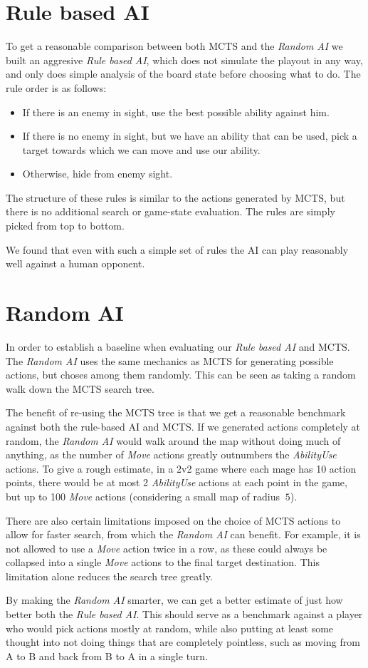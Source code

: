\section{Rule based AI}

To get a reasonable comparison between both MCTS and the \emph{Random AI} we
built an aggresive \emph{Rule based AI}, which does not simulate the playout in
any way, and only does simple analysis of the board state before choosing what
to do. The rule order is as follows:

\begin{itemize}
\item If there is an enemy in sight, use the best possible ability against him.
\item If there is no enemy in sight, but we have an ability that can be used, pick a target towards which we can move and use our ability.
\item Otherwise, hide from enemy sight.
\end{itemize}

The structure of these rules is similar to the actions generated by MCTS,
but there is no additional search or game-state evaluation. The rules are
simply picked from top to bottom.

We found that even with such a simple set of rules the AI can play reasonably
well against a human opponent.

\section{Random AI}

In order to establish a baseline when evaluating our \emph{Rule based AI} and MCTS\@.
The \emph{Random AI} uses the same mechanics as MCTS for generating possible actions,
but choses among them randomly. This can be seen as taking a random walk down
the MCTS search tree.

The benefit of re-using the MCTS tree is that we get a reasonable benchmark against
both the rule-based AI and MCTS\@. If we generated actions completely at random, the \emph{Random AI}
would walk around the map without doing much of anything, as the number of \emph{Move} actions
greatly outnumbers the \emph{AbilityUse} actions. To give a rough estimate, in a 2v2 game where
each mage has 10 action points, there would be at most 2 \emph{AbilityUse} actions at each point
in the game, but up to 100 \emph{Move} actions (considering a small map of radius $~5$).

There are also certain limitations imposed on the choice of MCTS actions to allow for faster search,
from which the \emph{Random AI} can benefit. For example, it is not allowed to use a \emph{Move}
action twice in a row, as these could always be collapsed into a single \emph{Move} actions to the
final target destination. This limitation alone reduces the search tree greatly.

By making the \emph{Random AI} smarter, we can get a better estimate of just how better
both the \emph{Rule based AI}. This should serve as a benchmark against a player who would
pick actions mostly at random, while also putting at least some thought into not doing things
that are completely pointless, such as moving from A to B and back from B to A in a single turn.
